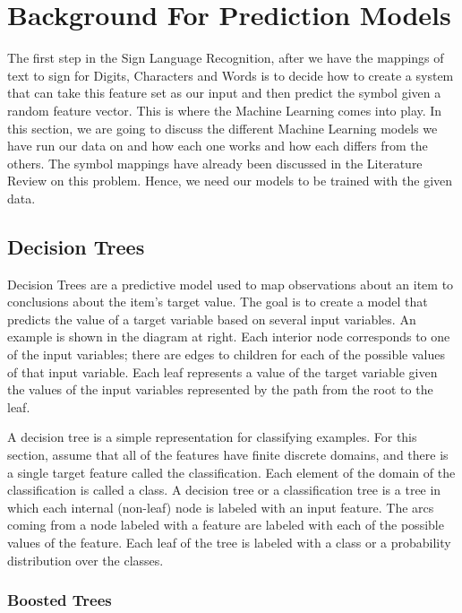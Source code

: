 \chapter{Background For Prediction Models}

\label{ch:background}

The first step in the Sign Language Recognition, after we have the mappings of text to sign for Digits, Characters and Words is to decide how to create a system that can take this feature set as our input and then predict the symbol given a random feature vector. This is where the Machine Learning comes into play. In this section, we are going to discuss the different Machine Learning models we have run our data on and how each one works and how each differs from the others. The symbol mappings have already been discussed in the Literature Review on this problem. Hence, we need our models to be trained with the given data.

\section{Decision Trees}

Decision Trees are a predictive model used to map observations about an item to conclusions about the item's target value. The goal is to create a model that predicts the value of a target variable based on several input variables. An example is shown in the diagram at right. Each interior node corresponds to one of the input variables; there are edges to children for each of the possible values of that input variable. Each leaf represents a value of the target variable given the values of the input variables represented by the path from the root to the leaf.

A decision tree is a simple representation for classifying examples. For this section, assume that all of the features have finite discrete domains, and there is a single target feature called the classification. Each element of the domain of the classification is called a class. A decision tree or a classification tree is a tree in which each internal (non-leaf) node is labeled with an input feature. The arcs coming from a node labeled with a feature are labeled with each of the possible values of the feature. Each leaf of the tree is labeled with a class or a probability distribution over the classes.


\subsection{Boosted Trees}

